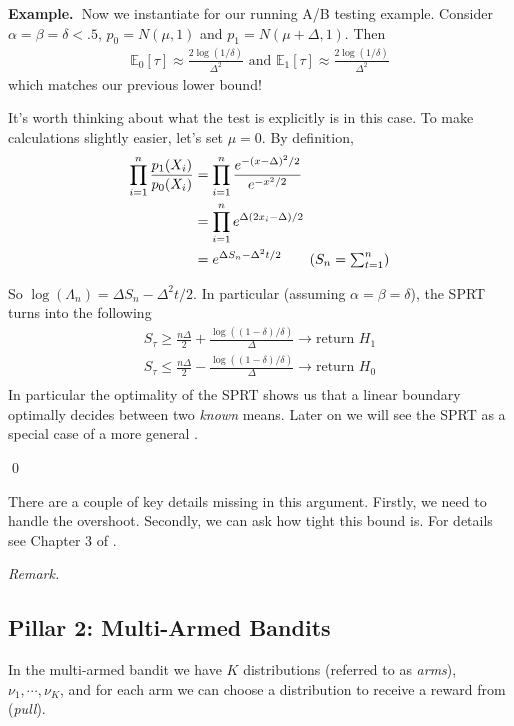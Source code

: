 \documentclass[11pt]{article}
\newcommand{\example}{\noindent\textbf{Example.\  }}
\newcommand{\remark}{\noindent\textit{Remark.}}
\newcommand{\E}{\mathbb{E}}
\newcommand{\1}[1]{\mathbf{1}\left\{#1\right\}}
\begin{document}
\example Now we instantiate for our running A/B testing example. Consider $\alpha = \beta = \delta < .5$, $p_0 = N(\mu,1)$ and $p_1 = N(\mu+\Delta, 1)$. Then
\begin{align}
    \E_0[\tau] \approx \frac{2\log(1/\delta)}{\Delta^2} \text{ and } \E_1[\tau] \approx \frac{2\log(1/\delta)}{\Delta^2}
\end{align}
which matches our previous lower bound!

It's worth thinking about what the test is explicitly is in this case. To make calculations slightly easier, let's set $\mu = 0$. By definition,
\begin{align*}
    \prod_{i=1}^n \frac{p_1(X_i)}{p_0(X_i)}
    &= \prod_{i=1}^n \frac{e^{-(x-\Delta)^2/2}}{e^{-x^2/2}}\\
    &= \prod_{i=1}^n e^{\Delta(2x_i-\Delta)/2}\\
    &= e^{\Delta S_n-\Delta^2t/2} \tag{$S_n = \sum_{t=1}^n$}
\end{align*}

So $\log(\Lambda_n) = \Delta S_n-\Delta^2t/2$. In particular (assuming $\alpha = \beta = \delta$), the SPRT turns into the following 
\begin{align*}
    S_{\tau} \geq \frac{n\Delta}{2} +  \frac{\log((1-\delta)/\delta)}{\Delta} \rightarrow \text{return $H_1$}\\
    S_{\tau} \leq \frac{n\Delta}{2} -  \frac{\log((1-\delta)/\delta)}{\Delta} \rightarrow \text{return $H_0$}\\
\end{align*}
In particular the optimality of the SPRT shows us that a linear boundary optimally decides between two \textit{known} means. Later on we will see the SPRT as a special case of a more general .

\qed


There are a couple of key details missing in this argument. Firstly, we need to handle the overshoot. Secondly, we can ask how tight this bound is. For details see Chapter 3 of \cite{tartakovsky2014sequential}.

\remark

\subsection{Pillar 2: Multi-Armed Bandits}

In the multi-armed bandit we have $K$ distributions (referred to as \textit{arms}), $\nu_1, \cdots, \nu_K$, and for each arm we can choose a distribution to receive a reward from (\textit{pull}). 
\end{document}
